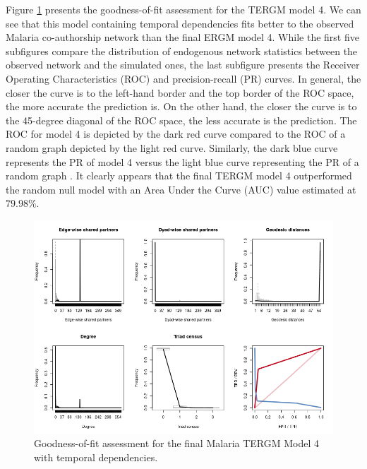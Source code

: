 Figure \ref{fig:malaria_tergm-gof} presents the goodness-of-fit assessment for the TERGM model 4. We can see that this model containing temporal dependencies fits better to the observed Malaria co-authorship network than the final ERGM model 4. While the first five subfigures compare the distribution of endogenous network statistics between the observed network and the simulated ones, the last subfigure presents the Receiver Operating Characteristics (ROC) and precision-recall (PR) curves. In general, the closer the curve is to the left-hand border and the top border of the ROC space, the more accurate the prediction is. On the other hand, the closer the curve is to the 45-degree diagonal of the ROC space, the less accurate is the prediction. The ROC for model 4 is depicted by the dark red curve compared to the ROC of a random graph depicted by the light red curve. Similarly, the dark blue curve represents the PR of model 4 versus the light blue curve representing the PR of a random graph \cite{leifeld_temporal_2015}. It clearly appears that the final TERGM model 4 outperformed the random null model with an Area Under the Curve (AUC) value estimated at $79.98\%$.

\begin{figure}
\centering
\includegraphics[scale=0.9]{Chapters/malaria/statMod/tergm_gof}
\caption{Goodness-of-fit assessment for the final Malaria TERGM Model 4 with temporal dependencies.}
\label{fig:malaria_tergm-gof}
\end{figure}
\pagebreak
